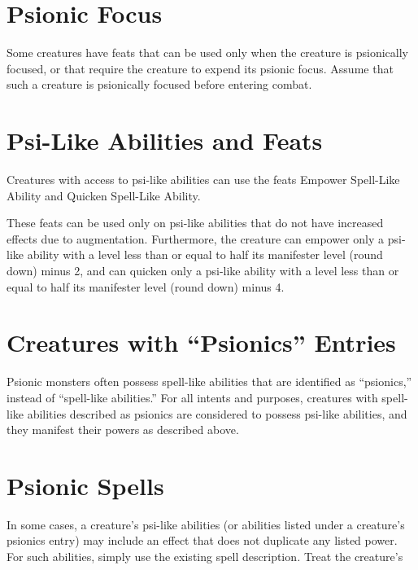 \documentclass{article}
\begin{document}
\vspace{12pt}
\section*{\textbf{Psionic Focus}}

Some creatures have feats that can be used only when the creature is psionically 
focused, or that require the creature to expend its psionic focus. Assume that 
such a creature is psionically focused before entering combat.

\vspace{12pt}
\section*{\textbf{Psi-Like Abilities and Feats}}

Creatures with access to psi-like abilities can use the feats Empower Spell-Like 
Ability and Quicken Spell-Like Ability.

These feats can be used only on psi-like abilities that do not have increased effects 
due to augmentation. Furthermore, the creature can empower only a psi-like ability 
with a level less than or equal to half its manifester level (round down) minus 
2, and can quicken only a psi-like ability with a level less than or equal to half 
its manifester level (round down) minus 4.

\vspace{12pt}
\section*{\textbf{Creatures with ``Psionics'' Entries}}

Psionic monsters often possess spell-like abilities that are identified as ``psionics,'' 
instead of ``spell-like abilities.'' For all intents and purposes, creatures with 
spell-like abilities described as psionics are considered to possess psi-like abilities, 
and they manifest their powers as described above.

\vspace{12pt}
\section*{\textbf{Psionic Spells}}

In some cases, a creature's psi-like abilities (or abilities listed under a creature's 
psionics entry) may include an effect that does not duplicate any listed power. 
For such abilities, simply use the existing spell description\textit{. }Treat the 
creature's
\end{document}
